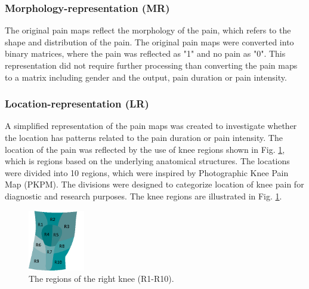 \subsubsection{Morphology-representation (MR)}
The original pain maps reflect the morphology of the pain, which refers to the shape and distribution of the pain. The original pain maps were converted into binary matrices, where the pain was reflected as "1" and no pain as "0". This representation did not require further processing than converting the pain maps to a matrix including gender and the output, pain duration or pain intensity. 

\subsubsection{Location-representation (LR)} 
A simplified representation of the pain maps was created to investigate whether the location has patterns related to the pain duration or pain intensity. The location of the pain was reflected by the use of knee regions shown in Fig. \ref{fig:atlas}, which is regions based on the underlying anatomical structures.
The locations were divided into 10 regions, which were inspired by Photographic Knee Pain Map (PKPM). The divisions were designed to categorize location of knee pain for diagnostic and research purposes.\citep{Elson2010} The knee regions are illustrated in Fig. \ref{fig:atlas}.

\begin{figure} [H] 
\centering
\includegraphics[width=0.22\textwidth]{Figures/atlas}
\caption{The regions of the right knee (R1-R10).}
\label{fig:atlas}
\end{figure}

